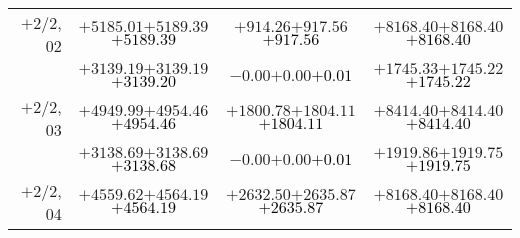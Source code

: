 \documentclass[compress]{beamer}
\begin{document}
\begin{frame}
{\begin{tabular}{r | c | c | c}
$+$2/2, 02 & $+5185.01$\hspace{0.1 cm}$+5189.39$\hspace{0.1 cm}\textcolor{black}{$+5189.39$} & $+914.26$\hspace{0.1 cm}$+917.56$\hspace{0.1 cm}\textcolor{black}{$+917.56$} & $+8168.40$\hspace{0.1 cm}$+8168.40$\hspace{0.1 cm}\textcolor{black}{$+8168.40$} \\
           & $+3139.19$\hspace{0.1 cm}$+3139.19$\hspace{0.1 cm}\textcolor{black}{$+3139.20$} & $-0.00$\hspace{0.1 cm}$+0.00$\hspace{0.1 cm}\textcolor{black}{$+0.01$} & $+1745.33$\hspace{0.1 cm}$+1745.22$\hspace{0.1 cm}\textcolor{black}{$+1745.22$} \\
$+$2/2, 03 & $+4949.99$\hspace{0.1 cm}$+4954.46$\hspace{0.1 cm}\textcolor{black}{$+4954.46$} & $+1800.78$\hspace{0.1 cm}$+1804.11$\hspace{0.1 cm}\textcolor{black}{$+1804.11$} & $+8414.40$\hspace{0.1 cm}$+8414.40$\hspace{0.1 cm}\textcolor{black}{$+8414.40$} \\
           & $+3138.69$\hspace{0.1 cm}$+3138.69$\hspace{0.1 cm}\textcolor{black}{$+3138.68$} & $-0.00$\hspace{0.1 cm}$+0.00$\hspace{0.1 cm}\textcolor{black}{$+0.01$} & $+1919.86$\hspace{0.1 cm}$+1919.75$\hspace{0.1 cm}\textcolor{black}{$+1919.75$} \\
$+$2/2, 04 & $+4559.62$\hspace{0.1 cm}$+4564.19$\hspace{0.1 cm}\textcolor{black}{$+4564.19$} & $+2632.50$\hspace{0.1 cm}$+2635.87$\hspace{0.1 cm}\textcolor{black}{$+2635.87$} & $+8168.40$\hspace{0.1 cm}$+8168.40$\hspace{0.1 cm}\textcolor{black}{$+8168.40$} \\

\end{tabular}}
\end{frame}
\end{document}
